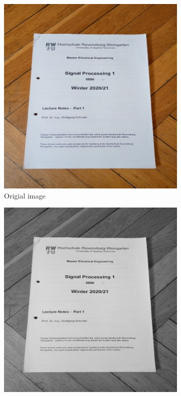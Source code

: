 \documentclass{scrartcl}
\begin{document}
  \begin{figure}[!htbp]
    \centering
    \begin{subfigure}[b]{0.3\textwidth}
      \centering
      \includegraphics[width=\textwidth]{pictures/results/wood1/original.png}
      \caption{Origial image}
    \end{subfigure}
    \begin{subfigure}[b]{0.3\textwidth}
      \centering
      \includegraphics[width=\textwidth]{pictures/results/wood1/grayscale.png}

\end{subfigure}
\end{figure}
\end{document}
